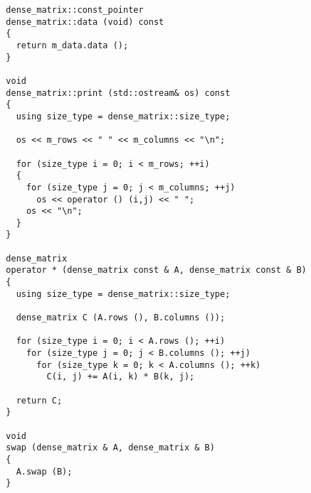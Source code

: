 \begin{lstlisting}
  dense_matrix::const_pointer
  dense_matrix::data (void) const
  {
    return m_data.data ();
  }

  void 
  dense_matrix::print (std::ostream& os) const
  {
    using size_type = dense_matrix::size_type;

    os << m_rows << " " << m_columns << "\n";
    
    for (size_type i = 0; i < m_rows; ++i)
    {
      for (size_type j = 0; j < m_columns; ++j)
        os << operator () (i,j) << " ";
      os << "\n";
    }
  }

  dense_matrix
  operator * (dense_matrix const & A, dense_matrix const & B)
  {
    using size_type = dense_matrix::size_type;

    dense_matrix C (A.rows (), B.columns ());

    for (size_type i = 0; i < A.rows (); ++i)
      for (size_type j = 0; j < B.columns (); ++j)
        for (size_type k = 0; k < A.columns (); ++k)
          C(i, j) += A(i, k) * B(k, j);

    return C;
  }

  void
  swap (dense_matrix & A, dense_matrix & B)
  {
    A.swap (B);
  }
\end{lstlisting}


















